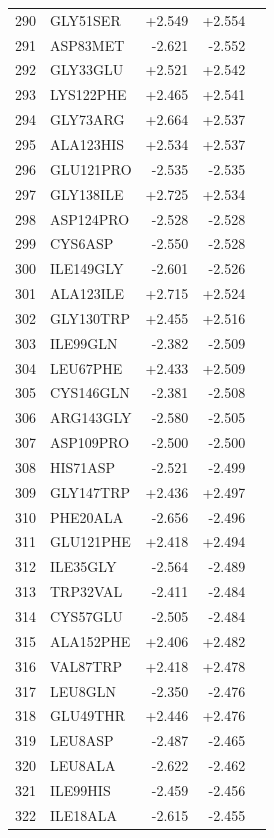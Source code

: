 \begin{longtable}{r l r r c}
290 & GLY51SER & +2.549 & +2.554 &  \\
291 & ASP83MET & -2.621 & -2.552 &  \\
292 & GLY33GLU & +2.521 & +2.542 &  \\
293 & LYS122PHE & +2.465 & +2.541 &  \\
294 & GLY73ARG & +2.664 & +2.537 &  \\
295 & ALA123HIS & +2.534 & +2.537 &  \\
296 & GLU121PRO & -2.535 & -2.535 &  \\
297 & GLY138ILE & +2.725 & +2.534 &  \\
298 & ASP124PRO & -2.528 & -2.528 &  \\
299 & CYS6ASP & -2.550 & -2.528 &  \\
300 & ILE149GLY & -2.601 & -2.526 &  \\
301 & ALA123ILE & +2.715 & +2.524 &  \\
302 & GLY130TRP & +2.455 & +2.516 &  \\
303 & ILE99GLN & -2.382 & -2.509 &  \\
304 & LEU67PHE & +2.433 & +2.509 &  \\
305 & CYS146GLN & -2.381 & -2.508 &  \\
306 & ARG143GLY & -2.580 & -2.505 &  \\
307 & ASP109PRO & -2.500 & -2.500 &  \\
308 & HIS71ASP & -2.521 & -2.499 &  \\
309 & GLY147TRP & +2.436 & +2.497 &  \\
310 & PHE20ALA & -2.656 & -2.496 &  \\
311 & GLU121PHE & +2.418 & +2.494 &  \\
312 & ILE35GLY & -2.564 & -2.489 &  \\
313 & TRP32VAL & -2.411 & -2.484 &  \\
314 & CYS57GLU & -2.505 & -2.484 &  \\
315 & ALA152PHE & +2.406 & +2.482 &  \\
316 & VAL87TRP & +2.418 & +2.478 &  \\
317 & LEU8GLN & -2.350 & -2.476 &  \\
318 & GLU49THR & +2.446 & +2.476 &  \\
319 & LEU8ASP & -2.487 & -2.465 &  \\
320 & LEU8ALA & -2.622 & -2.462 &  \\
321 & ILE99HIS & -2.459 & -2.456 &  \\
322 & ILE18ALA & -2.615 & -2.455 &  \\

\end{longtable}
